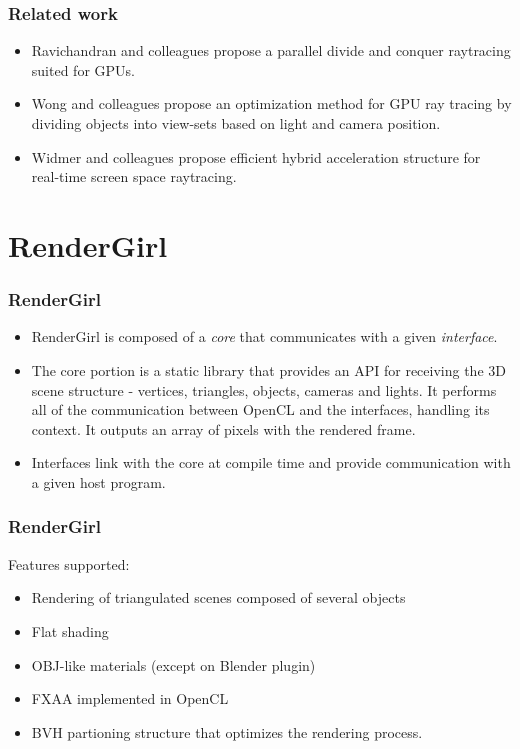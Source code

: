 \documentclass{beamer}
\begin{document}
\begin{frame}
\frametitle{Related work}

\begin{itemize}

\item Ravichandran and colleagues propose a parallel divide and
  conquer raytracing suited for GPUs\cite{Ravichandran}.

\item Wong and colleagues propose an optimization method for GPU ray
  tracing by dividing objects into view-sets based on light and camera
  position\cite{Wong}.

\item Widmer and colleagues propose efficient hybrid acceleration
  structure for real-time screen space raytracing\cite{Widmer}.

\end{itemize}

\end{frame}

\section{RenderGirl}
\begin{frame}
\frametitle{RenderGirl}

\begin{itemize}

\item RenderGirl is composed of a \emph{core} that communicates with a
  given \emph{interface}.

\item The core portion is a static library that provides an API for
  receiving the 3D scene structure - vertices, triangles, objects,
  cameras and lights. It performs all of the communication between
  OpenCL and the interfaces, handling its context. It outputs an array
  of pixels with the rendered frame.

\item Interfaces link with the core at compile time and provide
  communication with a given host program.

\end{itemize}

\end{frame}

\begin{frame}
  \frametitle{RenderGirl}

Features supported:

\begin{itemize}
\item Rendering of triangulated scenes composed of several objects
\item Flat shading
\item OBJ-like materials (except on Blender plugin)
\item FXAA implemented in OpenCL
\item BVH partioning structure that optimizes the rendering process.
\end{itemize}

\end{frame}
\end{document}
